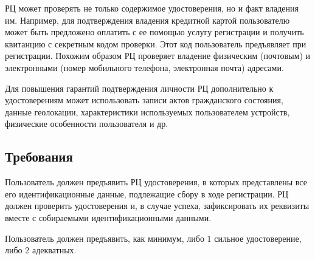 
РЦ может проверять не только содержимое удостоверения, но и факт владения 
им. Например, для подтверждения владения кредитной картой пользователю 
может быть предложено оплатить с ее помощью услугу регистрации и 
получить квитанцию с секретным кодом проверки. Этот код пользователь 
предъявляет при регистрации.
%
Похожим образом РЦ проверяет владение физическим (почтовым) 
и электронными (номер мобильного телефона, электронная почта) адресами.

Для повышения гарантий подтверждения личности РЦ дополнительно к 
удостоверениям может использовать записи актов гражданского состояния, 
данные геолокации, характеристики используемых пользователем устройств, 
физические особенности пользователя и др.
%


\subsection{Требования}\label{IP.Reqs}


Пользователь должен предъявить РЦ удостоверения, в которых 
представлены все его идентификационные данные, подлежащие сбору в 
ходе регистрации. 
%
РЦ должен проверить удостоверения и, в случае успеха, зафиксировать
их реквизиты вместе с собираемыми идентификационными данными.

%

Пользователь должен предъявить, как минимум, либо 1 сильное удостоверение,
либо 2 адекватных.



